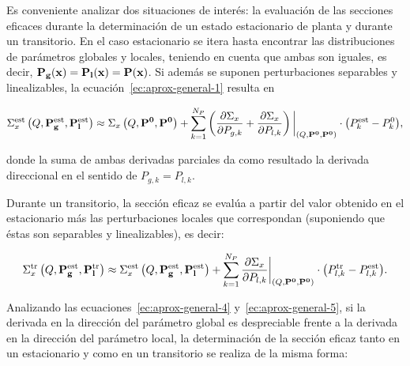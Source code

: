\documentclass[11pt]{article}
\renewcommand{\vec}[1]{\ensuremath\mathbf{#1}}
\begin{document}
Es conveniente analizar dos situaciones de interés: la evaluación de las secciones eficaces durante la determinación de un estado estacionario de planta y durante un transitorio. En el caso estacionario se itera hasta encontrar las distribuciones de parámetros globales y locales, teniendo en cuenta que ambas son iguales, es decir, $\vec{P_g} (\vec{x}) = \vec{P_l} (\vec{x}) = \vec{P} (\vec{x})$. Si además se suponen perturbaciones separables y linealizables, la ecuación~\ref{ec:aprox-general-1} resulta en

\begin{equation} \label{ec:aprox-general-4}
 \Sigma^{\text{est}}_x \left( Q, \vec{P^{\text{est}}_g}, \vec{P^{\text{est}}_l} \right) \approx
 \Sigma_x \left( Q, \vec{P^0}, \vec{P^0} \right) + 
 \sum_{k = 1}^{N_P}{\left( \frac{\partial\Sigma_x}{\partial P_{g,k}} + \frac{\partial\Sigma_x}{\partial P_{l,k}} \right)\bigg|_{\left( Q, \vec{P^0}, \vec{P^0} \right)} \cdot \left(P^{\text{est}}_k - P^0_k \right) },
\end{equation}

\noindent
donde la suma de ambas derivadas parciales da como resultado la derivada direccional en el sentido de $P_{g,k} = P_{l,k}$. 

Durante un transitorio, la sección eficaz se evalúa a partir del valor obtenido en el estacionario más las perturbaciones locales que correspondan (suponiendo que éstas son separables y linealizables), es decir:

\begin{equation} \label{ec:aprox-general-5}
 \Sigma^{\text{tr}}_x \left( Q, \vec{P^{\text{est}}_g}, \vec{P^{\text{tr}}_l} \right) \approx 
 \Sigma^{\text{est}}_x \left( Q, \vec{P^{\text{est}}_g}, \vec{P^{\text{est}}_l} \right) + 
 \sum_{k = 1}^{N_P}{\frac{\partial\Sigma_x}{\partial P_{l,k}}\bigg|_{\left( Q, \vec{P^0}, \vec{P^0} \right)} \cdot \left(P^{\text{tr}}_{l,k} - P^{\text{est}}_{l,k} \right) }.
\end{equation}

\noindent
Analizando las ecuaciones~\ref{ec:aprox-general-4} y~\ref{ec:aprox-general-5}, si la derivada en la dirección del parámetro global es despreciable frente a la derivada en la dirección del parámetro local, la determinación de la sección eficaz tanto en un estacionario y como en un transitorio se realiza de la misma forma:
\end{document}
